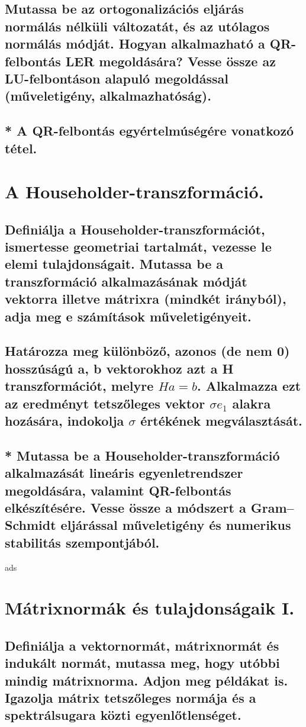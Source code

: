 \documentclass{article}
\begin{document}
        \subsection{Mutassa be az ortogonalizációs eljárás normálás nélküli változatát, és az utólagos normálás módját. Hogyan alkalmazható a QR-felbontás LER megoldására? Vesse össze az LU-felbontáson alapuló megoldással (műveletigény, alkalmazhatóság).}
        \subsection{* A QR-felbontás egyértelmúségére vonatkozó tétel.}


    \section{A Householder-transzformáció.}
        \subsection{Definiálja a Householder-transzformációt, ismertesse geometriai tartalmát, vezesse le elemi tulajdonságait. Mutassa be a transzformáció alkalmazásának módját vektorra illetve mátrixra (mindkét irányból), adja meg e számítások műveletigényeit.}
        \subsection{Határozza meg különböző, azonos (de nem 0) hosszúságú a, b vektorokhoz azt a H transzformációt, melyre $Ha = b$. Alkalmazza ezt az eredményt tetszőleges vektor $\sigma e_1$ alakra hozására, indokolja $\sigma$ értékének megválasztását.}
        \subsection{* Mutassa be a Householder-transzformáció alkalmazását lineáris egyenletrendszer megoldására, valamint QR-felbontás elkészítésére. Vesse össze a módszert a Gram–Schmidt eljárással műveletigény és numerikus stabilitás szempontjából.}

ads
    \section{Mátrixnormák és tulajdonságaik I.}
        \subsection{Definiálja a vektornormát, mátrixnormát és indukált normát, mutassa meg, hogy utóbbi mindig mátrixnorma. Adjon meg példákat is. Igazolja mátrix tetszőleges normája és a spektrálsugara közti egyenlőtlenséget.}
\end{document}
